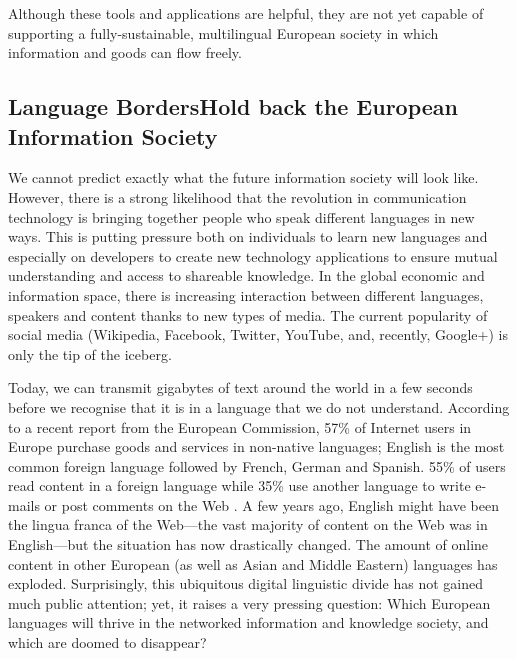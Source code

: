 \begin{multicols}{2}
Although these tools and applications are helpful, they are not yet capable of supporting a fully-sustainable, multilingual European society in which information and goods can flow freely.

\subsection[Language Borders Hold back the European Information Society]{Language Borders\newline Hold back the European Information Society}

We cannot predict exactly what the future information society will look like. 
However, there is a strong likelihood that the revolution in communication technology is bringing together people who speak different languages in new ways. This is putting pressure both on individuals to learn new languages and especially on developers to create new technology applications to ensure mutual understanding and access to shareable knowledge. In the global economic and information space, there is increasing interaction between different languages, speakers and content thanks to new types of media. The current popularity of social media (Wikipedia, Facebook, Twitter, YouTube, and, recently, Google+) is only the tip of the iceberg.


Today, we can transmit gigabytes of text around the world in a few seconds before we recognise that it is in a language that we do not understand. According to a recent report from the European Commission, 57\% of Internet users in Europe purchase goods and services in non-native languages; English is the most common foreign language followed by French, German and Spanish. 55\% of users read content in a foreign language while 35\% use another language to write e-mails or post comments on the Web \cite{EC1}. A few years ago, English might have been the lingua franca of the Web—the vast majority of content on the Web was in English—but the situation has now drastically changed. The amount of online content in other European (as well as Asian and Middle Eastern) languages has ex\-plo\-ded.
Surprisingly, this ubiquitous digital linguistic divide has not gained much public attention; yet, it raises a very pressing question: Which European languages will thrive in the networked information and knowledge society, and which are doomed to disappear?


\end{multicols}
